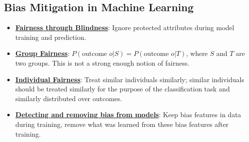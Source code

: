 \documentclass{article}%
\begin{document}
\subsection{Bias Mitigation in Machine Learning}%
\label{subsec:BiasMitigationinMachineLearning}%
\begin{itemize}[leftmargin=*]%
\item \href{https://purdue.brightspace.com/d2l/common/assets/pdfjs-d2l-dist/1.0.14-legacy/web/viewer.html?file=\%2Fcontent\%2Fenforced\%2F1095467-wl.202510.CS.24300.001\%2F16L2-ethics.pdf\%3Fou\%3D1095467\&lang=en-us\&container=d2l-fileviewer-rendered-pdf\&fullscreen=d2l-fileviewer-rendered-pdf-dialog\&height=667#page=25}{\textbf{Fairness through Blindness}}: Ignore protected attributes during model training and prediction.%
\item \href{https://purdue.brightspace.com/d2l/common/assets/pdfjs-d2l-dist/1.0.14-legacy/web/viewer.html?file=\%2Fcontent\%2Fenforced\%2F1095467-wl.202510.CS.24300.001\%2F16L2-ethics.pdf\%3Fou\%3D1095467\&lang=en-us\&container=d2l-fileviewer-rendered-pdf\&fullscreen=d2l-fileviewer-rendered-pdf-dialog\&height=667#page=26}{\textbf{Group Fairness}}: $P(\text{outcome } o | S) = P(\text{outcome } o | T)$, where $S$ and $T$ are two groups. This is not a strong enough notion of fairness.%
\item \href{https://purdue.brightspace.com/d2l/common/assets/pdfjs-d2l-dist/1.0.14-legacy/web/viewer.html?file=\%2Fcontent\%2Fenforced\%2F1095467-wl.202510.CS.24300.001\%2F16L2-ethics.pdf\%3Fou\%3D1095467\&lang=en-us\&container=d2l-fileviewer-rendered-pdf\&fullscreen=d2l-fileviewer-rendered-pdf-dialog\&height=667#page=27}{\textbf{Individual Fairness}}: Treat similar individuals similarly; similar individuals should be treated similarly for the purpose of the classification task and similarly distributed over outcomes.%
\item \href{https://purdue.brightspace.com/d2l/common/assets/pdfjs-d2l-dist/1.0.14-legacy/web/viewer.html?file=\%2Fcontent\%2Fenforced\%2F1095467-wl.202510.CS.24300.001\%2F16L2-ethics.pdf\%3Fou\%3D1095467\&lang=en-us\&container=d2l-fileviewer-rendered-pdf\&fullscreen=d2l-fileviewer-rendered-pdf-dialog\&height=667#page=34}{\textbf{Detecting and removing bias from models}}: Keep bias features in data during training, remove what was learned from these bias features after training.%
\end{itemize}

%
\end{document}
